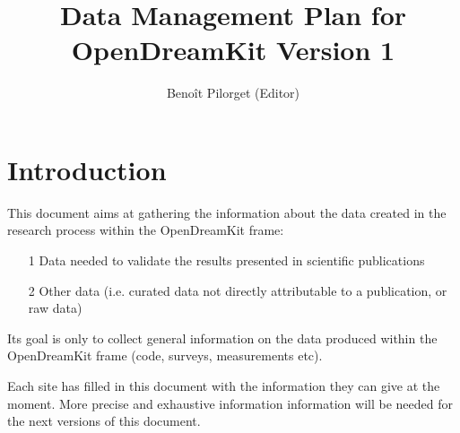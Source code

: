 \documentclass[12pt]{article}
\title{Data Management Plan for OpenDreamKit
Version 1}
\author{Benoît Pilorget (Editor)}
\begin{document}
\maketitle
\tableofcontents\newpage

\section{Introduction}

This document aims at gathering the information about the data created in the research process within the OpenDreamKit frame:

\begin{enumerate}
\item[1] Data needed to validate the results presented in scientific publications
\item[2] Other data (i.e. curated data not directly attributable to a publication, or raw data)
\end{enumerate}
Its goal is only to collect general information on the data produced within the OpenDreamKit frame (code, surveys, measurements etc). 

Each site has filled in this document with the information they can give at the moment. More precise and exhaustive information information will be needed for the next versions of this document.
\end{document}
